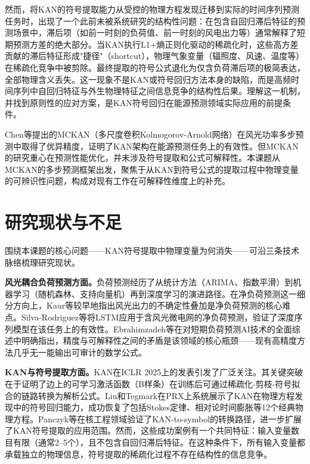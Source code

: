 然而，将KAN的符号提取能力从受控的物理方程发现迁移到实际的时间序列预测任务时，出现了一个此前未被系统研究的结构性问题：在包含自回归滞后特征的预测场景中，滞后项（如前一时刻的负荷值、前一时刻的风电出力等）通常解释了短期预测方差的绝大部分。当KAN执行L1+熵正则化驱动的稀疏化时，这些高方差贡献的滞后特征形成"捷径"（shortcut），物理气象变量（辐照度、风速、温度等）在稀疏化竞争中被剪除。最终提取的符号公式退化为仅含负荷滞后项的极简表达，全部物理含义丢失。这一现象不是KAN或符号回归方法本身的缺陷，而是高频时间序列中自回归特征与外生物理特征之间信息竞争的结构性后果。理解这一机制，并找到原则性的应对方案，是KAN符号回归在能源预测领域实际应用的前提条件。

Chen等\cite{chen2025mckan}提出的MCKAN（多尺度卷积Kolmogorov-Arnold网络）在风光功率多步预测中取得了优异精度，证明了KAN架构在能源预测任务上的有效性。但MCKAN的研究重心在预测性能优化，并未涉及符号提取和公式可解释性。本课题从MCKAN的多步预测框架出发，聚焦于从KAN到符号公式的提取过程中物理变量的可辨识性问题，构成对现有工作在可解释性维度上的补充。

\section{研究现状与不足}

围绕本课题的核心问题——KAN符号提取中物理变量为何消失——可沿三条技术脉络梳理研究现状。

\textbf{风光耦合负荷预测方面。}负荷预测经历了从统计方法（ARIMA、指数平滑）到机器学习（随机森林、支持向量机）再到深度学习的演进路径\cite{hong2016probabilistic,ebrahimzadeh2024ai}。在净负荷预测这一细分方向上，Kaur等\cite{kaur2016net}较早地指出风光出力的不确定性叠加是净负荷预测的核心难点。Silva-Rodriguez等\cite{silva2024lstm}将LSTM应用于含风光微电网的净负荷预测，验证了深度序列模型在该任务上的有效性。Ebrahimzadeh等\cite{ebrahimzadeh2024ai}在对短期负荷预测AI技术的全面综述中明确指出，精度与可解释性之间的矛盾是该领域的核心瓶颈——现有高精度方法几乎无一能输出可审计的数学公式。

\textbf{KAN与符号提取方面。}KAN\cite{liu2025kan}在ICLR 2025上的发表引发了广泛关注。其关键突破在于证明了边上的可学习激活函数（B样条）在训练后可通过稀疏化-剪枝-符号拟合的链路转换为解析公式。Liu和Tegmark\cite{liu2025kan2}在PRX上系统展示了KAN在物理方程发现中的符号回归能力，成功恢复了包括Stokes定律、相对论时间膨胀等12个经典物理方程。Panczyk等\cite{panczyk2024kan}在核工程领域验证了KAN-to-symbol的转换路径，进一步扩展了KAN符号提取的应用范围。然而，这些成功案例有一个共同特征：输入变量数目有限（通常2--5个），且不包含自回归滞后特征。在这种条件下，所有输入变量都承载独立的物理信息，符号提取的稀疏化过程不存在结构性的信息竞争。

